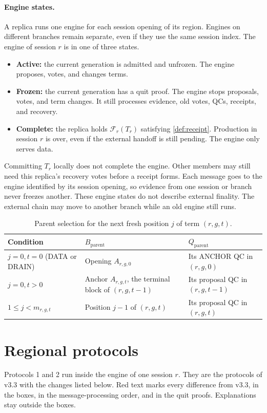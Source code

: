 \documentclass[11pt,a4paper]{article}
\newcommand{\RR}[1]{{\color{rrRed}#1}}
\newcommand{\FC}{\mathcal F}
\newcounter{protocol}
\begin{document}
\paragraph{Engine states.}
A replica runs one engine for each session opening of its region.
Engines on different branches remain separate, even if they use the
same session index. The engine of
session $r$ is in one of three states.
\begin{itemize}
\item \textbf{Active:} the current generation is admitted and unfrozen.
The engine proposes, votes, and changes terms.
\item \textbf{Frozen:} the current generation has a quit proof. The
engine stops proposals, votes, and term changes. It still processes
evidence, old votes, QCs, receipts, and recovery.
\item \textbf{Complete:} the replica holds $\FC_r(T_r)$ satisfying
\cref{def:receipt}.
Production in session $r$ is over, even if the external handoff is still
pending. The engine only serves data.
\end{itemize}
Committing $T_r$ locally does not complete the engine. Other members may
still need this replica's recovery votes before a receipt forms. Each
message goes to the engine identified by its session opening, so
evidence from one session or branch never freezes another. These engine
states do not describe external finality. The external chain may move
to another branch while an old engine still runs.

\begin{table}[htbp]\centering\small
\caption{Parent selection for the next fresh position $j$ of term $(r,g,t)$.}
\label{tab:parent}
\begin{tabularx}{\linewidth}{@{}l Y Y@{}}
\toprule
Condition & $B_{\mathrm{parent}}$ & $Q_{\mathrm{parent}}$\\
\midrule
$j=0,t=0$ (DATA or DRAIN) & Opening $A_{r,g,0}$ & Its ANCHOR QC in $(r,g,0)$\\
$j=0,t>0$ & Anchor $A_{r,g,t}$, the terminal block of $(r,g,t-1)$ & Its proposal QC in $(r,g,t-1)$\\
$1\le j<m_{r,g,t}$ & Position $j-1$ of $(r,g,t)$ & Its proposal QC in $(r,g,t)$\\
\bottomrule
\end{tabularx}
\end{table}

\section{Regional protocols}
\label{sec:protocols}
Protocols 1 and 2 run inside the engine of one session $r$. They are the
protocols of v3.3 with the changes listed below. \RR{Red text} marks
every difference from v3.3, in the boxes, in the message-processing
order, and in the quit proofs. Explanations stay outside the boxes.
\end{document}
